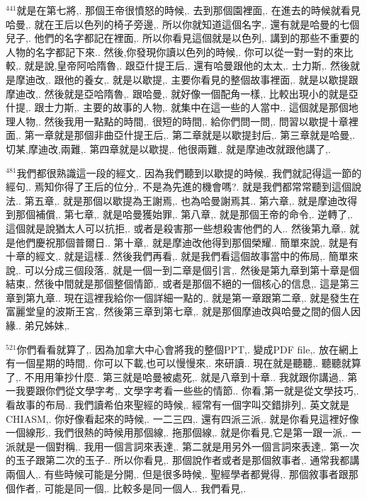 \documentclass{book}
\begin{document}
$^{441}$就是在第七將,.
那個王帝很憤怒的時候,.
去到那個園裡面,.
在進去的時候就看見哈曼,.
就在王后以色列的椅子旁邊,.
所以你就知道這個名字,.
還有就是哈曼的七個兒子,.
他們的名字都記在裡面,.
所以你看見這個就是以色列,.
講到的那些不重要的人物的名字都記下來..
然後,你發現你讀以色列的時候,.
你可以從一對一對的來比較,.
就是說,皇帝阿哈隋魯,.
跟亞什提王后,.
還有哈曼跟他的太太,.
士力斯,.
然後就是摩迪改,.
跟他的養女,.
就是以歇提,.
主要你看見的整個故事裡面,.
就是以歇提跟摩迪改,.
然後就是亞哈隋魯,.
跟哈曼,.
就好像一個配角一樣,.
比較出現小的就是亞什提,.
跟士力斯,.
主要的故事的人物,.
就集中在這一些的人當中..
這個就是那個地理人物,.
然後我用一點點的時間,.
很短的時間,.
給你們問一問,.
問習以歇提十章裡面,.
第一章就是那個非曲亞什提王后,.
第二章就是以歇提封后,.
第三章就是哈曼,.
切某,摩迪改,兩難,.
第四章就是以歇提,.
他很兩難,.
就是摩迪改就跟他講了,.

$^{481}$我們都很熟識這一段的經文,.
因為我們聽到以歇提的時候,.
我們就記得這一節的經句,.
焉知你得了王后的位分,.
不是為先進的機會嗎?.
就是我們都常常聽到這個說法..
第五章,.
就是那個以歇提為王謝焉,.
也為哈曼謝焉其..
第六章,.
就是摩迪改得到那個補償,.
第七章,.
就是哈曼獲始罪,.
第八章,.
就是那個王帝的命令,.
逆轉了,.
這個就是說猶太人可以抗拒,.
或者是殺害那一些想殺害他們的人..
然後第九章,.
就是他們慶祝那個普爾日..
第十章,.
就是摩迪改他得到那個榮耀..
簡單來說,.
就是有十章的經文,.
就是這樣..
然後我們再看,.
就是我們看這個故事當中的佈局,.
簡單來說,.
可以分成三個段落,.
就是一個一到二章是個引言,.
然後是第九章到第十章是個結束,.
然後中間就是那個整個情節,.
或者是那個不絕的一個核心的信息,.
這是第三章到第九章..
現在這裡我給你一個詳細一點的,.
就是第一章跟第二章,.
就是發生在富麗堂皇的波斯王宮,.
然後第三章到第七章,.
就是那個摩迪改與哈曼之間的個人因緣..
弟兄姊妹,.

$^{521}$你們看看就算了,.
因為加拿大中心會將我的整個PPT,.
變成PDF file,.
放在網上有一個星期的時間,.
你可以下載,也可以慢慢來,.
來研讀..
現在就是聽聽,.
聽聽就算了,.
不用用筆抄什麼..
第三就是哈曼被處死,.
就是八章到十章..
我就跟你講過,.
第一我要跟你們從文學字考,.
文學字考看一些些的情節..
你看,第一就是從文學技巧,.
看故事的布局..
我們讀希伯來聖經的時候,.
經常有一個字叫交錯排列,.
英文就是CHIASM,.
你好像看起來的時候,.
一二三四,.
還有四派三派,.
就是你看見這裡好像一個線形,.
我們很熱的時候用那個線,.
拖那個線,.
就是你看見,它是第一跟一派,.
一派就是一個對稱,.
我用一個言詞來表達,.
第二就是用另外一個言詞來表達,.
第一次的玉子跟第二次的玉子..
所以你看見,.
那個說作者或者是那個敘事者,.
通常我都講兩個人,.
有些時候可能是分開,.
但是很多時候,.
聖經學者都覺得,.
那個敘事者跟那個作者,.
可能是同一個,.
比較多是同一個人..
我們看見,.
\end{document}

